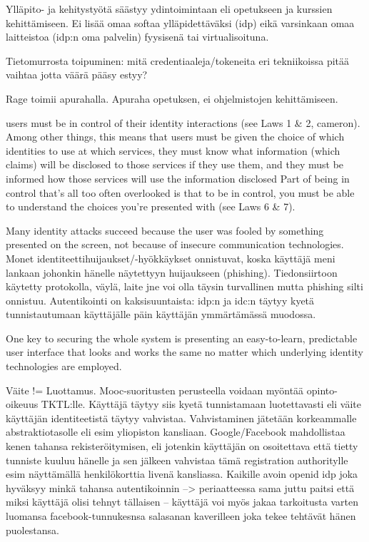 \documentclass[finnish,gradu]{tktltiki}
\begin{document}
  Ylläpito- ja kehitystyötä säästyy ydintoimintaan eli opetukseen ja kurssien kehittämiseen. Ei lisää omaa softaa ylläpidettäväksi (idp) eikä varsinkaan omaa laitteistoa (idp:n oma palvelin) fyysisenä tai virtualisoituna.

  Tietomurrosta toipuminen: mitä credentiaaleja/tokeneita eri tekniikoissa pitää vaihtaa jotta väärä pääsy estyy?

  Rage toimii apurahalla. Apuraha opetuksen, ei ohjelmistojen kehittämiseen.

  users must be in control of their identity interactions (see Laws 1 \& 2, cameron). Among other things, this means that users must be given the choice of which identities to use at which services, they must know what information (which claims) will be disclosed to those services if they use them, and they must be informed how those services will use the information disclosed
  Part of being in control that’s all too often overlooked is that to be in control, you must be able to understand the choices you’re presented with (see Laws 6 \& 7).

  Many identity attacks succeed because the user was fooled by something presented on the screen, not because of insecure  communication technologies. Monet identiteettihuijaukset/-hyökkäykset onnistuvat, koska käyttäjä meni lankaan johonkin hänelle näytettyyn huijaukseen (phishing). Tiedonsiirtoon käytetty protokolla, väylä, laite jne voi olla täysin turvallinen mutta phishing silti onnistuu. Autentikointi on kaksisuuntaista: idp:n ja idc:n täytyy kyetä tunnistautumaan käyttäjälle päin käyttäjän ymmärtämässä muodossa.

  One key to securing the whole system is presenting an easy-to-learn, predictable user interface that looks and works the same no matter which underlying identity technologies are employed.

  Väite != Luottamus. Mooc-suoritusten perusteella voidaan myöntää opinto-oikeuus TKTL:lle. Käyttäjä täytyy siis kyetä tunnistamaan luotettavasti eli väite käyttäjän identiteetistä täytyy vahvistaa. Vahvistaminen jätetään korkeammalle abstraktiotasolle eli esim yliopiston kansliaan. Google/Facebook mahdollistaa kenen tahansa rekisteröitymisen, eli jotenkin käyttäjän on osoitettava että tietty tunniste kuuluu hänelle ja sen jälkeen vahvistaa tämä registration authoritylle esim näyttämällä henkilökorttia livenä kansliassa. Kaikille avoin openid idp joka hyväksyy minkä tahansa autentikoinnin --> periaatteessa sama juttu paitsi että miksi käyttäjä olisi tehnyt tällaisen -- käyttäjä voi myös jakaa tarkoitusta varten luomansa facebook-tunnukesnsa salasanan kaverilleen joka tekee tehtävät hänen puolestansa.
\end{document}
